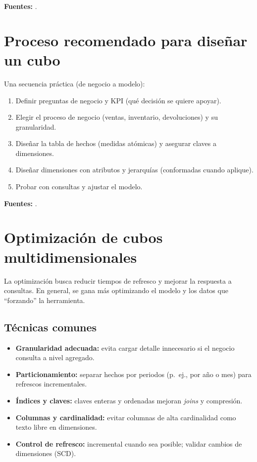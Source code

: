 \documentclass[12pt]{article}
\begin{document}
\noindent\textbf{Fuentes:} \cite{kimballgroup_star_olap, ibm_what_is_olap, kimball_bus_architecture}.

\section{Proceso recomendado para diseñar un cubo}
Una secuencia práctica (de negocio a modelo):
\begin{enumerate}[leftmargin=*, itemsep=0.25em]
  \item Definir preguntas de negocio y KPI (qué decisión se quiere apoyar).
  \item Elegir el proceso de negocio (ventas, inventario, devoluciones) y su granularidad.
  \item Diseñar la tabla de hechos (medidas atómicas) y asegurar claves a dimensiones.
  \item Diseñar dimensiones con atributos y jerarquías (conformadas cuando aplique).
  \item Probar con consultas y ajustar el modelo.
\end{enumerate}

\noindent\textbf{Fuentes:} \cite{kimballgroup_star_olap, mslearn_star_schema_powerbi}.

\section{Optimización de cubos multidimensionales}
La optimización busca reducir tiempos de refresco y mejorar la respuesta a consultas. En general, se gana más optimizando el modelo y los datos que ``forzando'' la herramienta.

\subsection*{Técnicas comunes}
\begin{itemize}[leftmargin=*, itemsep=0.25em]
  \item \textbf{Granularidad adecuada:} evita cargar detalle innecesario si el negocio consulta a nivel agregado.
  \item \textbf{Particionamiento:} separar hechos por periodos (p.\ ej., por año o mes) para refrescos incrementales.
  \item \textbf{Índices y claves:} claves enteras y ordenadas mejoran \textit{joins} y compresión.
  \item \textbf{Columnas y cardinalidad:} evitar columnas de alta cardinalidad como texto libre en dimensiones.
  \item \textbf{Control de refresco:} incremental cuando sea posible; validar cambios de dimensiones (SCD).
\end{itemize}
\end{document}
